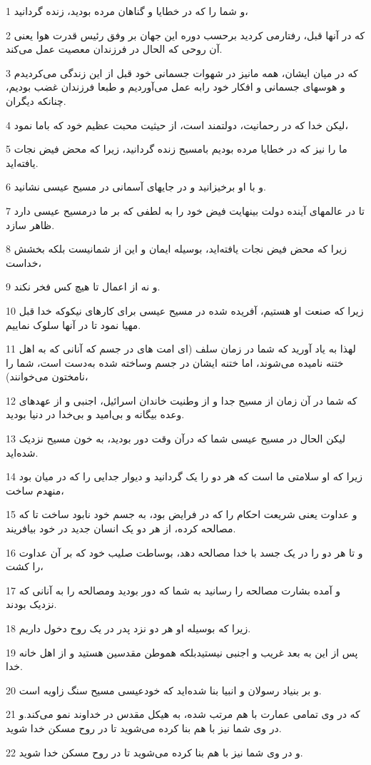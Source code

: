 \par 1 و شما را که در خطایا و گناهان مرده بودید، زنده گردانید،
\par 2 که در آنها قبل، رفتارمی کردید برحسب دوره این جهان بر وفق رئیس قدرت هوا یعنی آن روحی که الحال در فرزندان معصیت عمل می‌کند.
\par 3 که در میان ایشان، همه مانیز در شهوات جسمانی خود قبل از این زندگی می‌کردیدم و هوسهای جسمانی و افکار خود رابه عمل می‌آوردیم و طبعا فرزندان غضب بودیم، چنانکه دیگران.
\par 4 لیکن خدا که در رحمانیت، دولتمند است، از حیثیت محبت عظیم خود که باما نمود،
\par 5 ما را نیز که در خطایا مرده بودیم بامسیح زنده گردانید، زیرا که محض فیض نجات یافته‌اید.
\par 6 و با او برخیزانید و در جایهای آسمانی در مسیح عیسی نشانید.
\par 7 تا در عالمهای آینده دولت بینهایت فیض خود را به لطفی که بر ما درمسیح عیسی دارد ظاهر سازد.
\par 8 زیرا که محض فیض نجات یافته‌اید، بوسیله ایمان و این از شمانیست بلکه بخشش خداست،
\par 9 و نه از اعمال تا هیچ ‌کس فخر نکند.
\par 10 زیرا که صنعت او هستیم، آفریده شده در مسیح عیسی برای کارهای نیکوکه خدا قبل مهیا نمود تا در آنها سلوک نماییم.
\par 11 لهذا به یاد آورید که شما در زمان سلف (ای امت های در جسم که آنانی که به اهل ختنه نامیده می‌شوند، اما ختنه ایشان در جسم وساخته شده به‌دست است، شما را نامختون می‌خوانند)،
\par 12 که شما در آن زمان از مسیح جدا و از وطنیت خاندان اسرائیل، اجنبی و از عهدهای وعده بیگانه و بی‌امید و بی‌خدا در دنیا بودید.
\par 13 لیکن الحال در مسیح عیسی شما که درآن وقت دور بودید، به خون مسیح نزدیک شده‌اید.
\par 14 زیرا که او سلامتی ما است که هر دو را یک گردانید و دیوار جدایی را که در میان بود منهدم ساخت،
\par 15 و عداوت یعنی شریعت احکام را که در فرایض بود، به جسم خود نابود ساخت تا که مصالحه کرده، از هر دو یک انسان جدید در خود بیافریند.
\par 16 و تا هر دو را در یک جسد با خدا مصالحه دهد، بوساطت صلیب خود که بر آن عداوت را کشت،
\par 17 و آمده بشارت مصالحه را رسانید به شما که دور بودید ومصالحه را به آنانی که نزدیک بودند.
\par 18 زیرا که بوسیله او هر دو نزد پدر در یک روح دخول داریم.
\par 19 پس از این به بعد غریب و اجنبی نیستیدبلکه هموطن مقدسین هستید و از اهل خانه خدا.
\par 20 و بر بنیاد رسولان و انبیا بنا شده‌اید که خودعیسی مسیح سنگ زاویه است.
\par 21 که در وی تمامی عمارت با هم مرتب شده، به هیکل مقدس در خداوند نمو می‌کند.و در وی شما نیز با هم بنا کرده می‌شوید تا در روح مسکن خدا شوید.
\par 22 و در وی شما نیز با هم بنا کرده می‌شوید تا در روح مسکن خدا شوید.

